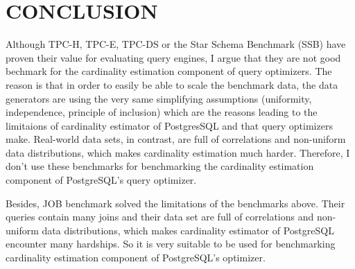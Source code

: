 \section{CONCLUSION}
{\justify
Although TPC-H, TPC-E, TPC-DS or the Star Schema Benchmark (SSB) have proven their value for evaluating query engines, I argue that they are not good bechmark for the cardinality estimation component of query optimizers. The reason is that in order to easily be able to scale the benchmark data, the data generators are using the very same simplifying assumptions (uniformity, independence, principle of inclusion) which are the reasons leading to the limitaions of cardinality estimator of PostgresSQL and that query optimizers make. Real-world data sets, in contrast, are full of correlations and non-uniform data distributions, which makes cardinality estimation much harder. Therefore, I don't use these benchmarks for benchmarking the cardinality estimation component of PostgreSQL's query optimizer.
\par }
\vspace{0.5cm}
{\justify
Besides, JOB benchmark solved the limitations of the benchmarks above. Their queries contain many joins and their data set are full of correlations and non-uniform data distributions, which makes cardinality estimator of PostgreSQL encounter many hardships. So it is very suitable to be used for benchmarking cardinality estimation component of PostgreSQL's optimizer.
\par }
\vspace{0.5cm}


